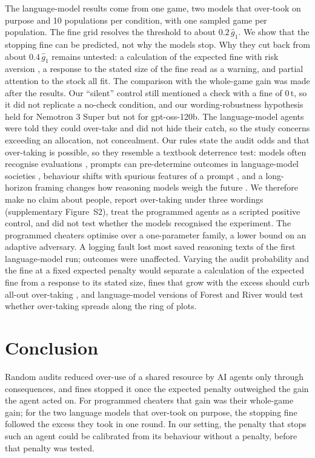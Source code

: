 The language-model results come from one game, two models that over-took on purpose and 10 populations per condition, with one sampled game per population. The fine grid resolves the threshold to about $0.2\,\hat g_1$. We show that the stopping fine can be predicted, not why the models stop. Why they cut back from about $0.4\,\hat g_1$ remains untested: a calculation of the expected fine with risk aversion \citep{allingham1972income}, a response to the stated size of the fine read as a warning, and partial attention to the stock all fit. The comparison with the whole-game gain was made after the results. Our ``silent'' control still mentioned a check with a fine of 0\,t, so it did not replicate a no-check condition, and our wording-robustness hypothesis held for Nemotron 3 Super but not for gpt-oss-120b. The language-model agents were told they could over-take and did not hide their catch, so the study concerns exceeding an allocation, not concealment. Our rules state the audit odds and that over-taking is possible, so they resemble a textbook deterrence test: models often recognise evaluations \citep{needham2025evaluation,li2026evaluation}, prompts can pre-determine outcomes in language-model societies \citep{zhou2026pimmur}, behaviour shifts with spurious features of a prompt \citep{sclar2024quantifying}, and a long-horizon framing changes how reasoning models weigh the future \citep{jung2026sode}. We therefore make no claim about people, report over-taking under three wordings (supplementary Figure~S2), treat the programmed agents as a scripted positive control, and did not test whether the models recognised the experiment. The programmed cheaters optimise over a one-parameter family, a lower bound on an adaptive adversary. A logging fault lost most saved reasoning texts of the first language-model run; outcomes were unaffected. Varying the audit probability and the fine at a fixed expected penalty would separate a calculation of the expected fine from a response to its stated size, fines that grow with the excess should curb all-out over-taking \citep{stigler1970optimum}, and language-model versions of Forest and River would test whether over-taking spreads along the ring of plots.

\section{Conclusion}

Random audits reduced over-use of a shared resource by AI agents only through consequences, and fines stopped it once the expected penalty outweighed the gain the agent acted on. For programmed cheaters that gain was their whole-game gain; for the two language models that over-took on purpose, the stopping fine followed the excess they took in one round. In our setting, the penalty that stops such an agent could be calibrated from its behaviour without a penalty, before that penalty was tested.



